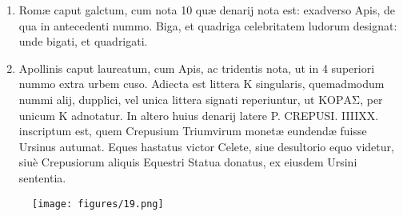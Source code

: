 \documentclass[a4paper, 11pt, oneside, polutonikogreek, latin]{article}
\begin{document}
\begin{enumerate}
    \item Romæ caput galctum, cum nota 10 quæ denarij nota est: exadverso Apis, de qua in antecedenti nummo. Biga, et quadriga celebritatem ludorum designat: unde bigati, et quadrigati.

    \item Apollinis caput laureatum, cum Apis, ac tridentis nota, ut in 4 superiori nummo extra urbem cuso. Adiecta est littera K singularis, quemadmodum nummi alij, dupplici, vel unica littera signati reperiuntur, ut \foreignlanguage{greek}{ΚΟΡΑΣ}, per unicum K adnotatur. In altero huius denarij latere P. CREPUSI. IIIIXX. inscriptum est, quem Crepusium Triumvirum monetæ eundendæ fuisse Ursinus autumat. Eques hastatus victor Celete, siue desultorio equo videtur, siuè Crepusiorum aliquis Equestri Statua donatus, ex eiusdem Ursini sententia.
\end{enumerate}
\clearpage
\vspace*{\fill}
\begin{figure}[H]
\centering
\texttt{[image: figures/19.png]}
\end{figure}
\vspace*{\fill}
\clearpage
\end{document}
